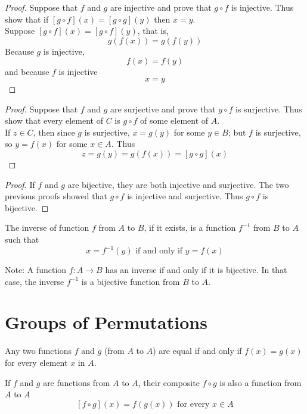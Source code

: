 \documentclass[12pt]{article}
\begin{document}
\begin{proof} Suppose that $f$ and $g$ are injective and prove that $g \circ f$ is injective. Thus show that if $[g \circ f](x) = [g \circ g](y)$ then $x = y$. \\
Suppose $[g \circ f](x) = [g \circ f](y)$, that is, $$g(f(x)) = g(f(y))$$
Because $g$ is injective, $$f(x) = f(y)$$ 
and because $f$ is injective $$x = y$$ \end{proof} 

\begin{proof} Suppose that $f$ and $g$ are surjective and prove that $g \circ f$ is surjective. Thus show that every element of $C$ is $g \circ f$ of some element of $A$. \\
If $z \in C$, then since $g$ is surjective, $x = g(y)$ for some $y \in B$; but $f$ is surjective, so $y = f(x)$ for some $x \in A$. Thus 
$$z = g(y) = g(f(x)) = [g \circ g](x)$$ \end{proof} 

\begin{proof} If $f$ and $g$ are bijective, they are both injective and surjective. The two previous proofs showed that $g \circ f$ is injective and surjective. Thus $g \circ f$ is bijective. \end{proof}

\begin{definition} The inverse of function $f$ from $A$ to $B$, if it exists, is a function $f^{-1}$ from $B$ to $A$ such that $$ x = f^{-1}(y) \text{ if and only if } y = f(x) $$ \end{definition} 
Note: A function $f: A \to B$ has an inverse if and only if it is bijective. In that case, the inverse $f^{-1}$ is a bijective function from $B$ to $A$. 

\section{Groups of Permutations}

\begin{definition} Any two functions $f$ and $g$ (from $A$ to $A$) are equal if and only if $f(x) = g(x)$ for every element $x$ in $A$. \end{definition} 

\begin{definition} If $f$ and $g$ are functions from $A$ to $A$, their composite $f \circ g$ is also a function from $A$ to $A$ 
$$[f \circ g](x) = f(g(x)) \text{ for every } x \in A $$ \end{definition} 
\end{document}
